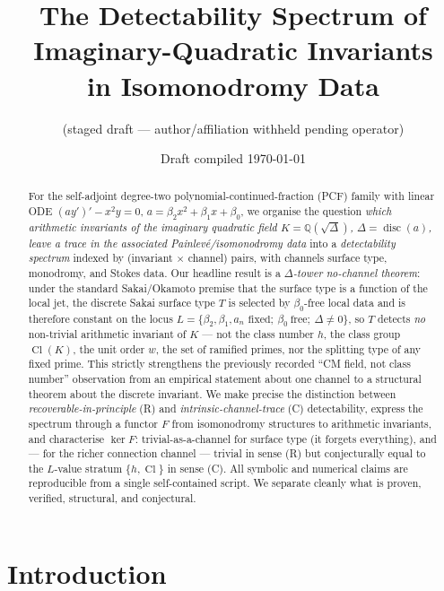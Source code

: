 \documentclass[11pt]{article}
\title{The Detectability Spectrum of Imaginary-Quadratic Invariants\\
in Isomonodromy Data}
\author{(staged draft --- author/affiliation withheld pending operator)}
\date{Draft compiled \today}
\theoremstyle{definition}
\newcommand{\Q}{\mathbb{Q}}
\newcommand{\Cl}{\operatorname{Cl}}
\newcommand{\disc}{\operatorname{disc}}
\begin{document}
\maketitle

\begin{abstract}
For the self-adjoint degree-two polynomial-continued-fraction (PCF) family with
linear ODE $(a y')'-x^2y=0$, $a=\beta_2x^2+\beta_1x+\beta_0$, we organise the
question \emph{which arithmetic invariants of the imaginary quadratic field
$K=\Q(\sqrt{\Delta})$, $\Delta=\disc(a)$, leave a trace in the associated
Painlev\'e/isomonodromy data} into a \emph{detectability spectrum} indexed by
(invariant $\times$ channel) pairs, with channels surface type, monodromy, and
Stokes data. Our headline result is a \emph{$\Delta$-tower no-channel theorem}: under
the standard Sakai/Okamoto premise that the surface type is a function of the local
jet, the discrete Sakai surface type $T$ is selected by $\beta_0$-free local data and is
therefore constant on the locus $L=\{\beta_2,\beta_1,a_n\text{ fixed};\ \beta_0\
\text{free};\ \Delta\neq0\}$, so $T$ detects \emph{no} non-trivial arithmetic
invariant of $K$ --- not the class number $h$, the class group $\Cl(K)$, the unit
order $w$, the set of ramified primes, nor the splitting type of any fixed prime.
This strictly strengthens the previously recorded ``CM field, not class number''
observation from an empirical statement about one channel to a structural theorem
about the discrete invariant. We make precise the distinction between
\emph{recoverable-in-principle} (R) and \emph{intrinsic-channel-trace} (C)
detectability, express the spectrum through a functor $F$ from isomonodromy
structures to arithmetic invariants, and characterise $\ker F$: trivial-as-a-channel
for surface type (it forgets everything), and --- for the richer connection
channel --- trivial in sense (R) but conjecturally equal to the $L$-value stratum
$\{h,\Cl\}$ in sense (C). All symbolic and numerical claims are reproducible from a
single self-contained script. We separate cleanly what is proven, verified,
structural, and conjectural.
\end{abstract}

\tableofcontents

\section{Introduction}
\end{document}
